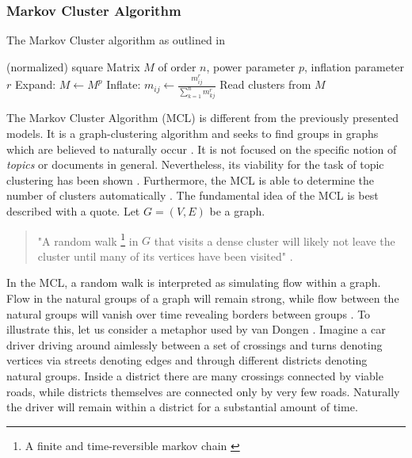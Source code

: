 \subsubsection{Markov Cluster Algorithm}
\begin{algorithm}[H]
\label{mclalg}
\caption{The Markov Cluster algorithm as outlined in \cite{vandongen00}}
\begin{algorithmic}
\REQUIRE (normalized) square Matrix $M$ of order $n$, power parameter $p$, inflation parameter $r$
\REPEAT
\STATE Expand: $M \leftarrow M^p$
\STATE Inflate: $m_{ij} \leftarrow \frac{m_{ij}^r}{\sum_{k=1}^n m_{kj}^r}$
\STATE Read clusters from $M$
\end{algorithmic}
\end{algorithm}
The Markov Cluster Algorithm \cite{vandongen00} (MCL) is different from the previously presented models. It is a graph-clustering algorithm and seeks to find groups in graphs which are believed to naturally occur \cite{vandongen00}. It is not focused on the specific notion of \textit{topics} or documents in general. Nevertheless, its viability for the task of topic clustering has been shown \cite{DBLP:conf/ecir/AkerKBPBHG16}. Furthermore, the MCL is able to determine the number of clusters automatically \cite{vandongen00}. The fundamental idea of the MCL is best described with a quote. Let $G = (V,E)$ be a graph. 
\begin{quote}
"A random walk \footnote{A finite and time-reversible markov chain \cite{Lovasz1996}} in $G$ that visits a dense cluster will likely not leave the cluster until many of its vertices have been visited" \cite{vandongen00}. 
\end{quote}
In the MCL, a random walk is interpreted as simulating flow within a graph. Flow in the natural groups of a graph will remain strong, while flow between the natural groups will vanish over time revealing borders between groups \cite{vandongen00}. To illustrate this, let us consider a metaphor used by van Dongen \cite{vandongen00}. Imagine a car driver driving around aimlessly between a set of crossings and turns denoting vertices via streets denoting edges and through different districts denoting natural groups. Inside a district there are many crossings connected by viable roads, while districts themselves are connected only by very few roads. Naturally the driver will remain within a district for a substantial amount of time. \par
